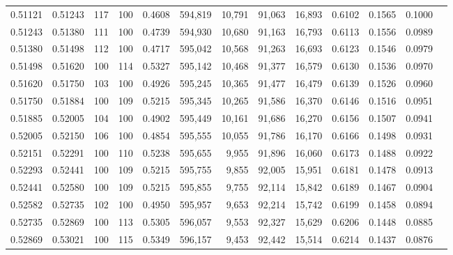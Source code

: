 \begin{tabular}{rrrrrrrrrrrrr}
0.51121 & 0.51243 &   117 & 100 &                                     0.4608 & 594,819 &  10,791 &  91,063 &  16,893 & 0.6102 & 0.1565 & 0.1000 \\
0.51243 & 0.51380 &   111 & 100 &                                     0.4739 & 594,930 &  10,680 &  91,163 &  16,793 & 0.6113 & 0.1556 & 0.0989 \\
0.51380 & 0.51498 &   112 & 100 &                                     0.4717 & 595,042 &  10,568 &  91,263 &  16,693 & 0.6123 & 0.1546 & 0.0979 \\
0.51498 & 0.51620 &   100 & 114 &                                     0.5327 & 595,142 &  10,468 &  91,377 &  16,579 & 0.6130 & 0.1536 & 0.0970 \\
0.51620 & 0.51750 &   103 & 100 &                                     0.4926 & 595,245 &  10,365 &  91,477 &  16,479 & 0.6139 & 0.1526 & 0.0960 \\
0.51750 & 0.51884 &   100 & 109 &                                     0.5215 & 595,345 &  10,265 &  91,586 &  16,370 & 0.6146 & 0.1516 & 0.0951 \\
0.51885 & 0.52005 &   104 & 100 &                                     0.4902 & 595,449 &  10,161 &  91,686 &  16,270 & 0.6156 & 0.1507 & 0.0941 \\
0.52005 & 0.52150 &   106 & 100 &                                     0.4854 & 595,555 &  10,055 &  91,786 &  16,170 & 0.6166 & 0.1498 & 0.0931 \\
0.52151 & 0.52291 &   100 & 110 &                                     0.5238 & 595,655 &   9,955 &  91,896 &  16,060 & 0.6173 & 0.1488 & 0.0922 \\
0.52293 & 0.52441 &   100 & 109 &                                     0.5215 & 595,755 &   9,855 &  92,005 &  15,951 & 0.6181 & 0.1478 & 0.0913 \\
0.52441 & 0.52580 &   100 & 109 &                                     0.5215 & 595,855 &   9,755 &  92,114 &  15,842 & 0.6189 & 0.1467 & 0.0904 \\
0.52582 & 0.52735 &   102 & 100 &                                     0.4950 & 595,957 &   9,653 &  92,214 &  15,742 & 0.6199 & 0.1458 & 0.0894 \\
0.52735 & 0.52869 &   100 & 113 &                                     0.5305 & 596,057 &   9,553 &  92,327 &  15,629 & 0.6206 & 0.1448 & 0.0885 \\
0.52869 & 0.53021 &   100 & 115 &                                     0.5349 & 596,157 &   9,453 &  92,442 &  15,514 & 0.6214 & 0.1437 & 0.0876 \\

\end{tabular}
